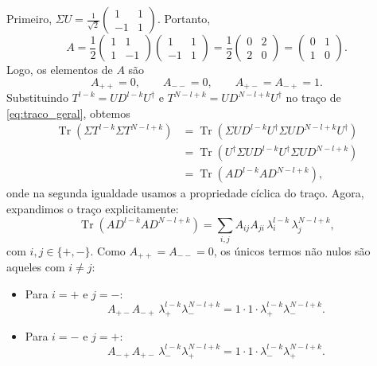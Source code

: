 \documentclass[11pt,a4paper]{article}
\begin{document}
%
Primeiro, $\Sigma U = \frac{1}{\sqrt{2}}
%
\begin{pmatrix}
1 & 1 \\
-1 & 1
\end{pmatrix}$. Portanto,
%
\begin{equation}
A = \frac{1}{2}
\begin{pmatrix}
1 & 1 \\
1 & -1
\end{pmatrix}
\begin{pmatrix}
1 & 1 \\
-1 & 1
\end{pmatrix}
= \frac{1}{2}
\begin{pmatrix}
0 & 2 \\
2 & 0
\end{pmatrix}
= \begin{pmatrix}
0 & 1 \\
1 & 0
\end{pmatrix}.
\label{eq:A_matrix}
\end{equation}
%
Logo, os elementos de $A$ são
%
\begin{equation}
A_{++} = 0, \qquad A_{--} = 0, \qquad A_{+-} = A_{-+} = 1.
\end{equation}
%
Substituindo $T^{l-k} = U D^{l-k} U^\dagger$ e $T^{N-l+k} = U D^{N-l+k} U^\dagger$ no traço de \eqref{eq:traco_geral}, obtemos
%
\begin{align}
\operatorname{Tr}\left( \Sigma T^{l-k} \Sigma T^{N-l+k} \right)
&= \operatorname{Tr}\left( \Sigma U D^{l-k} U^\dagger \Sigma U D^{N-l+k} U^\dagger \right) \nonumber \\
&= \operatorname{Tr}\left( U^\dagger \Sigma U D^{l-k} U^\dagger \Sigma U D^{N-l+k} \right) \nonumber \\
&= \operatorname{Tr}\left( A D^{l-k} A D^{N-l+k} \right),
\end{align}
%
onde na segunda igualdade usamos a propriedade cíclica do traço.
%
Agora, expandimos o traço explicitamente:
%
\begin{equation}
\operatorname{Tr}\left( A D^{l-k} A D^{N-l+k} \right)
= \sum_{i,j} A_{ij} A_{ji} \, \lambda_i^{l-k} \, \lambda_j^{N-l+k},
\end{equation}
%
com $i,j \in \{+, -\}$.
%
Como $A_{++} = A_{--} = 0$, os únicos termos não nulos são aqueles com $i \neq j$:
%
\begin{itemize}
\item Para $i = +$ e $j = -$:
\begin{equation}
A_{+-} A_{-+} \, \lambda_+^{l-k} \lambda_-^{N-l+k}
= 1 \cdot 1 \cdot \lambda_+^{l-k} \lambda_-^{N-l+k}.
\end{equation}
%
\item Para $i = -$ e $j = +$:
\begin{equation}
A_{-+} A_{+-} \, \lambda_-^{l-k} \lambda_+^{N-l+k}
= 1 \cdot 1 \cdot \lambda_-^{l-k} \lambda_+^{N-l+k}.
\end{equation}
\end{itemize}
\end{document}
